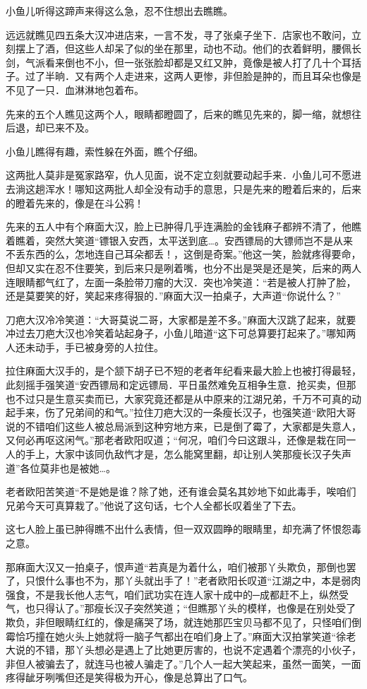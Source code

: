 \documentclass[12pt,oneside]{book}
\begin{document}
小鱼儿听得这蹄声来得这么急，忍不住想出去瞧瞧。

远远就瞧见四五条大汉冲进店来，一言不发，寻了张桌子坐下．店家也不敢问，立刻摆上了酒，但这些人却呆了似的坐在那里，动也不动。他们的衣着鲜明，腰佩长剑，气派看来倒也不小，但一张张脸却都是又红又肿，竟像是被人打了几十个耳括子。过了半晌．又有两个人走进来，这两人更惨，非但脸是肿的，而且耳朵也像是不见了一只．血淋淋地包着布。

先来的五个人瞧见这两个人，眼睛都瞪圆了，后来的瞧见先来的，脚一缩，就想往后退，却已来不及。

小鱼儿瞧得有趣，索性躲在外面，瞧个仔细。

这两批人莫非是冤家路窄，仇人见面，说不定立刻就要动起手来．小鱼儿可不愿进去淌这趟浑水！哪知这两批人却全没有动手的意思，只是先来的瞪着后来的，后来的瞪着先来的，像是在斗公鸦！

先来的五人中有个麻面大汉，脸上已肿得几乎连满脸的金钱麻子都辨不清了，他瞧着瞧着，突然大笑道``镖银入安西，太平送到底\ldots。安西镖局的大镖师岂不是从来不丢东西的么，怎地连自己耳朵都丢！，这倒是奇案。''他这一笑，脸就疼得要命，但却又实在忍不住要笑，到后来只是咧着嘴，也分不出是哭是还是笑，后来的两人连眼睛都气红了，左面一条脸带刀瘤的大汉．突也冷笑道：``若是被人打肿了脸，还是莫要笑的好，笑起来疼得狠的．''麻面大汉一拍桌子，大声道``你说什么？''

刀疤大汉冷冷笑道：``大哥莫说二哥，大家都是差不多。''麻面大汉跳了起来，就要冲过去刀疤大汉也冷笑着站起身子，小鱼儿暗道``这下可总算要打起来了。''哪知两人还未动手，手已被身旁的人拉住。

拉住麻面大汉手的，是个颔下胡子已不短的老者年纪看来最大脸上也被打得最轻，此刻摇手强笑道``安西镖局和定远镖局．平日虽然难免互相争生意．抢买卖，但那也不过只是生意买卖而已，大家究竟还都是从中原来的江湖兄弟，千万不可真的动起手来，伤了兄弟间的和气。''拉住刀疤大汉的一条瘦长汉子，也强笑道``欧阳大哥说的不错咱们这些人被总局派到这种穷地方来，已是倒了霉了，大家都是失意人，又何必再呕这闲气。''那老者欧阳叹道；``何况，咱们今曰这跟斗，还像是栽在同一人的手上，大家中该同仇敌忾才是，怎么能窝里翻，却让别人笑那瘦长汉子失声道''各位莫非也是被她\ldots。

老者欧阳苦笑道``不是她是谁？除了她，还有谁会莫名其妙地下如此毒手，唉咱们兄弟今天可真算栽了。''他说了这句话，七个人全都长叹着坐了下去。

这七人脸上虽已肿得瞧不出什么表情，但一双双圆睁的眼睛里，却充满了怀恨怨毒之意。

那麻面大汉又一拍桌子，恨声道``若真是为着什么，咱们被那丫头欺负，那倒也罢了，只恨什么事也不为，那丫头就出手了！''老者欧阳长叹道``江湖之中，本是弱肉强食，不是我长他人志气，咱们武功实在连人家十成中的─成都赶不上，纵然受气，也只得认了。''那瘦长汉子突然笑道；``但瞧那丫头的模样，也像是在别处受了欺负，非但眼睛红红的，像是痛哭了场，就连她那匹宝贝马都不见了，只怪咱们倒霉恰巧撞在她火头上她就将一脑子气都出在咱们身上了。''麻面大汉拍掌笑道``徐老大说的不错，那丫头想必是遇上了比她更厉害的，也说不定遇着个漂亮的小伙子，非但人被骗去了，就连马也被人骗走了。''几个人一起大笑起来，虽然一面笑，一面疼得龇牙咧嘴但还是笑得极为开心，像是总算出了口气。
\end{document}
